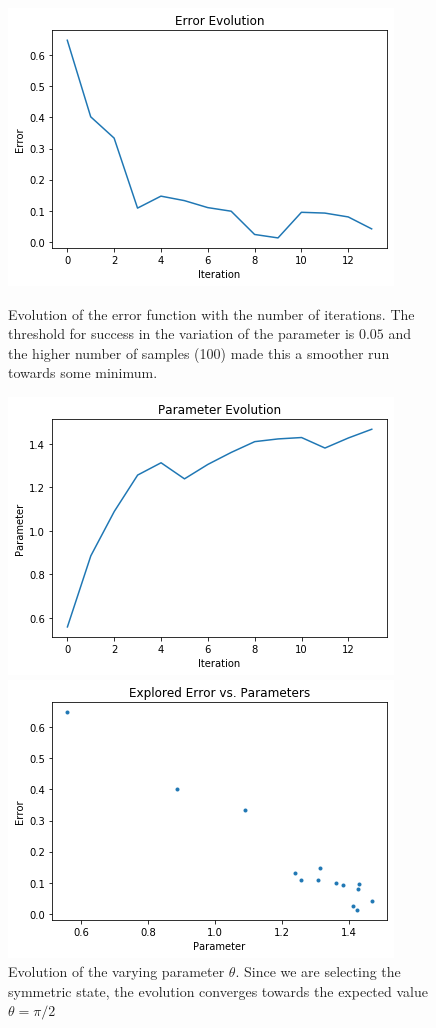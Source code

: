 \documentclass[11pt]{article}
\begin{document}
\begin{figure}[h!]
\centering
\includegraphics[scale=0.5]{error100}
\caption{Evolution of the error function with the number of iterations. The threshold for success in the variation of the parameter is $0.05$ and the higher number of samples (100) made this a smoother run towards some minimum.}
\includegraphics[scale=0.5]{parameter100}
\caption{Evolution of the varying parameter $\theta$. Since we are selecting the symmetric state, the evolution converges towards the expected value $\theta = \pi/2$}
\includegraphics[scale=0.5]{explored100}

\end{figure}
\end{document}
